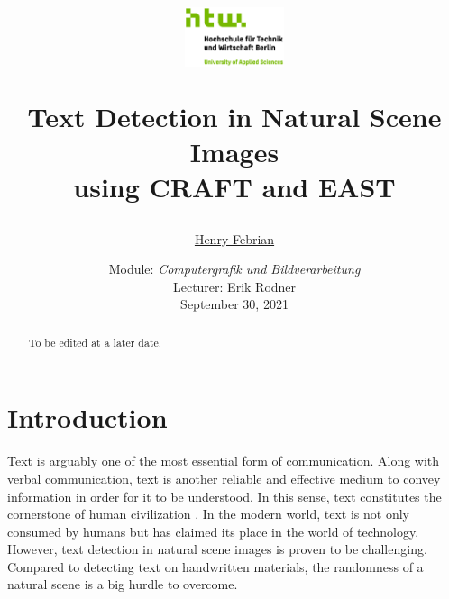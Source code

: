 \documentclass[10pt, a4paper]{article}
\begin{document}
	\title{
	\begin{figure}[!ht]
			\includegraphics[width=0.26\textwidth]{img/htwlogo.jpg}
	\end{figure}
	\vspace{1cm}
	\Huge Text Detection in Natural Scene Images \\
	using CRAFT and EAST
	}
	
	\vspace{1cm}
	
	
	\author{\Large \href{mailto:s0566146@htw-berlin.de}{Henry Febrian}
	\vspace{1cm}}
	
	\date{
	\large Module: \textit{Computergrafik und Bildverarbeitung} \\
	\vspace{0.8cm}
	\large Lecturer: Erik Rodner \\
	\vspace{1cm}
	\large September 30, 2021
	}

	\maketitle
	\setlength{\parindent}{0pt}

\vspace{2cm}
\begin{abstract}
To be edited at a later date. 

\end{abstract}
	\newpage
	\tableofcontents
	\newpage
	
\section{Introduction} %
\label{sec:introduction}
Text is arguably one of the most essential form of communication. Along with verbal communication, text is another reliable and effective medium to convey information in order for it to be understood. In this sense, text constitutes the cornerstone of human civilization \citep{LongEtAl}.
In the modern world, text is not only consumed by humans but has claimed its place in the world of technology.
However, text detection in natural scene images is proven to be challenging. Compared to detecting text on handwritten materials, the randomness of a natural scene is a big hurdle to overcome.
\end{document}
